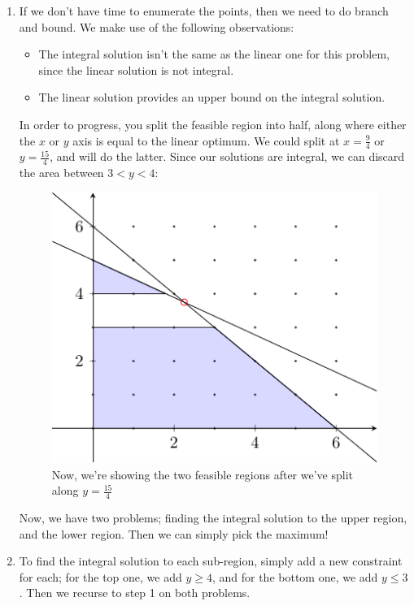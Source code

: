 \begin{enumerate}
  \item If we don't have time to enumerate the points, then we need to do 
  branch and bound. We make use of the following observations:
  
  \begin{itemize}
    \item The integral solution isn't the same as the linear one for this
      problem, since the linear solution is not integral.
    \item The linear solution provides an upper bound on the integral solution.
  \end{itemize}

  In order to progress, you split the feasible region into half, along where
  either the $x$ or $y$ axis is equal to the linear optimum. We could split at
  $x = \frac{9}{4}$ or $y = \frac{15}{4}$, and will do the latter. Since our
  solutions are integral, we can discard the area between $3 < y < 4$:

  \begin{figure}[H]
    \centering
    \includegraphics{diagrams/graph6}
    \caption{Now, we're showing the two feasible regions after we've split 
      along $y = \frac{15}{4}$}
    \label{fig:graph-6}
  \end{figure}

  Now, we have two problems; finding the integral solution to the upper region,
  and the lower region. Then we can simply pick the maximum!

\item To find the integral solution to each sub-region, simply add a new 
  constraint for each; for the top one, we add $y \geq 4$, and for the bottom 
  one, we add $y \leq 3$. Then we recurse to step 1 on both problems.


\end{enumerate}
